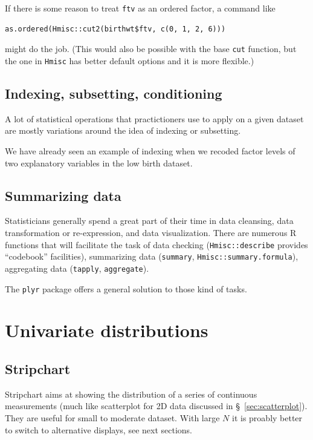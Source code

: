 \documentclass[a4paper,twoside]{book}
\renewcommand{\texttt}[1]{\lstinline{#1}}
\newcommand{\R}{\textsf{R}\xspace}
\begin{document}
If there is some reason to treat \texttt{ftv} as an ordered factor,
a command like
\begin{verbatim}
as.ordered(Hmisc::cut2(birthwt$ftv, c(0, 1, 2, 6)))
\end{verbatim}
might do the job. (This would also be possible with the base
\texttt{cut} function, but the one in
\texttt{Hmisc}\autocite{harrell11} has better default options and it
is more flexible.)

\section{Indexing, subsetting, conditioning}
A lot of statistical operations that practictioners use to apply on a
given dataset are mostly variations around the idea of indexing or
subsetting. 

We have already seen an example of indexing when we recoded factor
levels of two explanatory variables in the low birth dataset.

\section{Summarizing data}
Statisticians generally spend a great part of their time in data
cleansing, data transformation or re-expression\autocite{hoaglin83},
and data visualization. There are numerous \R functions that will
facilitate the task of data checking (\texttt{Hmisc::describe}
provides ``codebook'' facilities), summarizing data (\texttt{summary},
\texttt{Hmisc::summary.formula}), aggregating data (\texttt{tapply},
\texttt{aggregate}). 

The \texttt{plyr} package\autocite{wickham11} offers a general
solution to those kind of tasks.

\chapter{Univariate distributions}
\lipsum[1]

\section{Stripchart}
Stripchart aims at showing the distribution of a series of continuous
measurements (much like scatterplot for 2D data discussed in
\S~\ref{sec:scatterplot}). They are useful for small to moderate
dataset. With large $N$ it is proably better to switch to alternative
displays, see next sections.
\end{document}
